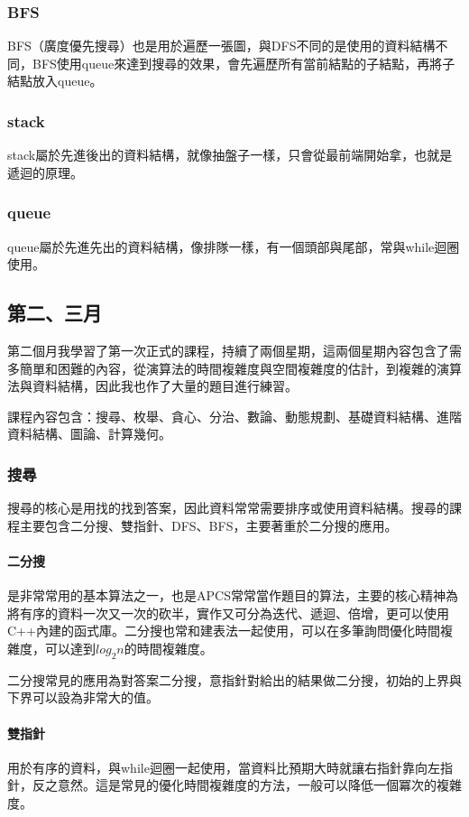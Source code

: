 \documentclass[a4paper, 18pt]{article}
\begin{document}
\subsubsection{BFS}
BFS（廣度優先搜尋）也是用於遍歷一張圖，與DFS不同的是使用的資料結構不同，BFS使用queue來達到搜尋的效果，會先遍歷所有當前結點的子結點，再將子結點放入queue。
\subsubsection{stack}
stack屬於先進後出的資料結構，就像抽盤子一樣，只會從最前端開始拿，也就是遞迴的原理。
\subsubsection{queue}
queue屬於先進先出的資料結構，像排隊一樣，有一個頭部與尾部，常與while迴圈使用。

\subsection{第二、三月}
第二個月我學習了第一次正式的課程，持續了兩個星期，這兩個星期內容包含了需多簡單和困難的內容，從演算法的時間複雜度與空間複雜度的估計，到複雜的演算法與資料結構，因此我也作了大量的題目進行練習。

課程內容包含：搜尋、枚舉、貪心、分治、數論、動態規劃、基礎資料結構、進階資料結構、圖論、計算幾何。

\subsubsection{搜尋}
搜尋的核心是用找的找到答案，因此資料常常需要排序或使用資料結構。搜尋的課程主要包含二分搜、雙指針、DFS、BFS，主要著重於二分搜的應用。

\paragraph{二分搜}
是非常常用的基本算法之一，也是APCS常常當作題目的算法，主要的核心精神為將有序的資料一次又一次的砍半，實作又可分為迭代、遞迴、倍增，更可以使用C++內建的函式庫。二分搜也常和建表法一起使用，可以在多筆詢問優化時間複雜度，可以達到\(log_2 n\)的時間複雜度。\par
二分搜常見的應用為對答案二分搜，意指針對給出的結果做二分搜，初始的上界與下界可以設為非常大的值。

\paragraph{雙指針}
用於有序的資料，與while迴圈一起使用，當資料比預期大時就讓右指針靠向左指針，反之意然。這是常見的優化時間複雜度的方法，一般可以降低一個冪次的複雜度。
\end{document}
